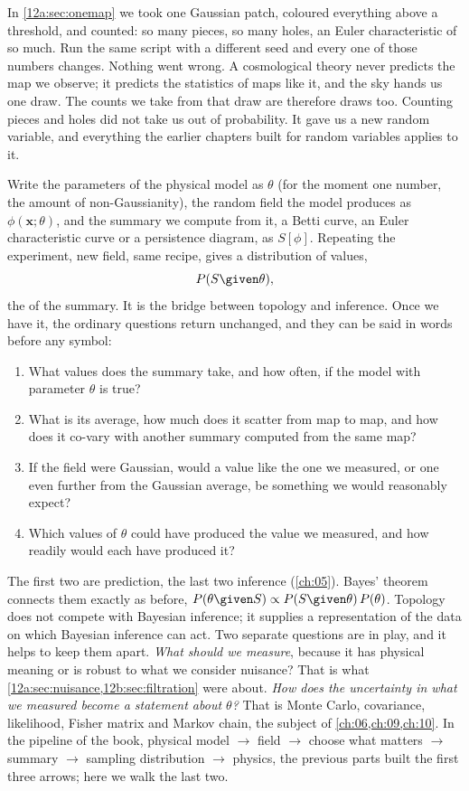 In \cref{12a:sec:onemap} we took one Gaussian patch, coloured everything above a threshold, and counted: so many
pieces, so many holes, an Euler characteristic of so much. Run the same script with a different seed and every
one of those numbers changes. Nothing went wrong. A cosmological theory never predicts the map we observe; it
predicts the statistics of maps like it, and the sky hands us one draw. The counts we take from that draw are
therefore draws too. Counting pieces and holes did not take us out of probability. It gave us a new random
variable, and everything the earlier chapters built for random variables applies to it.

Write the parameters of the physical model as $\theta$ (for the moment one number, the amount of non-Gaussianity),
the random field the model produces as $\phi(\bm x;\theta)$, and the summary we compute from it, a Betti curve, an
Euler characteristic curve or a persistence diagram, as $S[\phi]$. Repeating the experiment, new field, same
recipe, gives a distribution of values,
\begin{equation}
  P(S\given\theta),
  \label{12c:eq:sampling}
\end{equation}
the  of the summary. It is the bridge between topology and inference. Once we have
it, the ordinary questions return unchanged, and they can be said in words before any symbol:
\begin{enumerate}[itemsep=1pt]
  \item What values does the summary take, and how often, if the model with parameter $\theta$ is true?
  \item What is its average, how much does it scatter from map to map, and how does it co-vary with another summary
        computed from the same map?
  \item If the field were Gaussian, would a value like the one we measured, or one even further from the Gaussian
        average, be something we would reasonably expect?
  \item Which values of $\theta$ could have produced the value we measured, and how readily would each have
        produced it?
\end{enumerate}
The first two are prediction, the last two inference (\cref{ch:05}). Bayes' theorem connects them exactly as
before, $P(\theta\given S)\propto P(S\given\theta)\,P(\theta)$. Topology does not compete with Bayesian inference; it
supplies a representation of the data on which Bayesian inference can act. Two separate questions are in play, and
it helps to keep them apart. \emph{What should we measure}, because it has physical meaning or is robust to what
we consider nuisance? That is what \cref{12a:sec:nuisance,12b:sec:filtration} were about. \emph{How does the
uncertainty in what we measured become a statement about $\theta$?} That is Monte Carlo, covariance, likelihood,
Fisher matrix and Markov chain, the subject of \cref{ch:06,ch:09,ch:10}. In the pipeline of the book,
physical model $\to$ field $\to$ choose what matters $\to$ summary $\to$ sampling distribution $\to$ physics, the
previous parts built the first three arrows; here we walk the last two.

